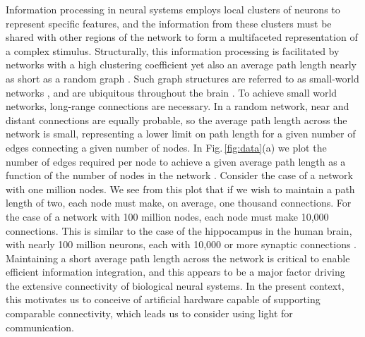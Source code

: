 \documentclass[twocolumn]{article}
\begin{document}
Information processing in neural systems employs local clusters of neurons to represent specific features, and the information from these clusters must be shared with other regions of the network to form a multifaceted representation of a complex stimulus. Structurally, this information processing is facilitated by networks with a high clustering coefficient yet also an average path length nearly as short as a random graph \cite{eskn2015}. Such graph structures are referred to as small-world networks \cite{wast1998}, and are ubiquitous throughout the brain \cite{sp2010}. To achieve small world networks, long-range connections are necessary. In a random network, near and distant connections are equally probable, so the average path length across the network is small, representing a lower limit on path length for a given number of edges connecting a given number of nodes. In Fig.\,\ref{fig:data}(a) we plot the number of edges required per node to achieve a given average path length as a function of the number of nodes in the network \cite{frfr2004}. Consider the case of a network with one million nodes. We see from this plot that if we wish to maintain a path length of two, each node must make, on average, one thousand connections. For the case of a network with 100 million nodes, each node must make 10,000 connections. This is similar to the case of the hippocampus in the human brain, with nearly 100 million neurons, each with 10,000 or more synaptic connections \cite{bu2006}. Maintaining a short average path length across the network is critical to enable efficient information integration, and this appears to be a major factor driving the extensive connectivity of biological neural systems. In the present context, this motivates us to conceive of artificial hardware capable of supporting comparable connectivity, which leads us to consider using light for communication.
\end{document}
